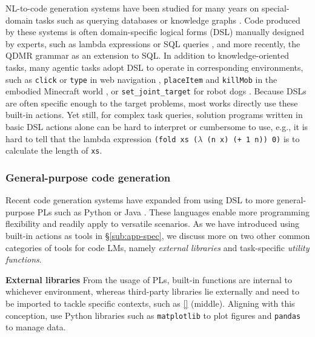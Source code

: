 NL-to-code generation systems have been studied for many years on special-domain tasks such as querying databases \citep{zelle1996learning,zettlemoyer2012learning} or knowledge graphs \citep{berant2013semantic}. Code produced by these systems is often domain-specific logical forms (DSL) manually designed by experts, such as lambda expressions \citep{liang2013lambda} or SQL queries \citep{yu2018spider}, and more recently, the QDMR grammar \citep{wolfson2020break} as an extension to SQL.
In addition to knowledge-oriented tasks, many agentic tasks adopt DSL to operate in corresponding environments, such as \texttt{click} or \texttt{type} in web navigation \citep{zheran2018reinforcement,webshop2022yao,zhou2024webarena}, \texttt{placeItem} and \texttt{killMob} in the embodied Minecraft world \citep{wang2023voyager}, or \texttt{set\_joint\_target} for robot dogs \citep{yu2023language}.
Because DSLs are often specific enough to the target problems, most works directly use these \textcolor{candypink}{built-in actions}.
Yet still, for complex task queries, solution programs written in basic DSL actions alone can be hard to interpret or cumbersome to use, e.g., it is hard to tell that the lambda expression \texttt{(fold xs ($\lambda$ (n x) (+ 1 n)) 0)} is to calculate the length of \texttt{xs}.




\subsubsection{General-purpose code generation}
\label{sub:general-codegen}
Recent code generation systems have expanded from using DSL to more general-purpose PLs such as Python or Java \citep{yin-neubig-2017-syntactic,chen2021evaluating}. These languages enable more programming flexibility and readily apply to versatile scenarios. 
As we have introduced using \textcolor{candypink}{built-in actions} as tools in \S\ref{sub:app-spec}, we discuss more on two other
common categories of tools for code LMs, namely \textcolor{ao!90}{\textit{external libraries}} and task-specific \textcolor{blue(ncs)}{\textit{utility functions}}.


\noindent \textbf{External libraries} \quad
From the usage of PLs, built-in functions are internal to whichever environment, whereas third-party libraries lie externally and need to be imported to tackle specific contexts, such as \autoref{} (middle). Aligning with this conception, \citet{zhang2023toolcoder} use Python libraries such as \texttt{matplotlib} to plot figures and \texttt{pandas} to manage data.


